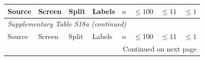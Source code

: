 \begingroup\small\setlength{\tabcolsep}{4pt}\renewcommand{\arraystretch}{0.97}

\begin{longtable}{llllrccc}

\toprule Source & Screen & Split & Labels & $n$ & $\leq100$ & $\leq11$ & $\leq1$ \\ \midrule\endfirsthead

\multicolumn{8}{l}{\textit{Supplementary Table S18a (continued)}} \\

\toprule Source & Screen & Split & Labels & $n$ & $\leq100$ & $\leq11$ & $\leq1$ \\ \midrule\endhead

\midrule\multicolumn{8}{r}{Continued on next page}\endfoot\bottomrule\endlastfoot


\end{longtable}
